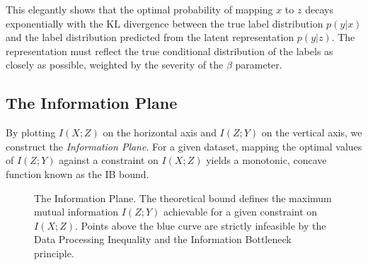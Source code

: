 This elegantly shows that the optimal probability of mapping $x$ to $z$ decays exponentially with the KL divergence between the true label distribution $p(y|x)$ and the label distribution predicted from the latent representation $p(y|z)$. The representation must reflect the true conditional distribution of the labels as closely as possible, weighted by the severity of the $\beta$ parameter.

\subsection{The Information Plane}

By plotting $I(X; Z)$ on the horizontal axis and $I(Z; Y)$ on the vertical axis, we construct the \textit{Information Plane}. For a given dataset, mapping the optimal values of $I(Z;Y)$ against a constraint on $I(X;Z)$ yields a monotonic, concave function known as the IB bound.

\begin{figure}[htbp]
    \centering
    \caption{The Information Plane. The theoretical bound defines the maximum mutual information $I(Z;Y)$ achievable for a given constraint on $I(X;Z)$. Points above the blue curve are strictly infeasible by the Data Processing Inequality and the Information Bottleneck principle.}
    \label{fig:info_plane}
\end{figure}

